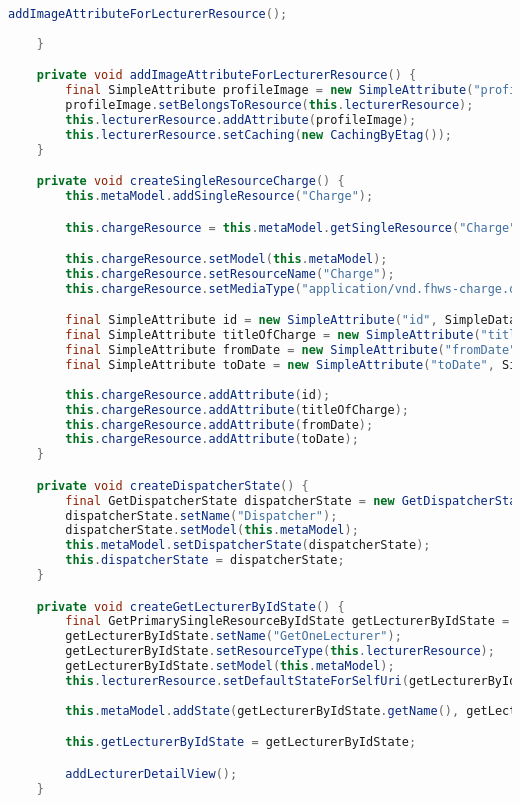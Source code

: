 \begin{lstlisting}[label=lst:enfield_model,
language=java,
firstnumber=1,
caption=Beschreibung des \textit{Enfield-Modell} der Referenzimplementierung. ]
		addImageAttributeForLecturerResource();
		
	}

	private void addImageAttributeForLecturerResource() {
		final SimpleAttribute profileImage = new SimpleAttribute("profileImageUrl", SimpleDatatype.IMAGE);
		profileImage.setBelongsToResource(this.lecturerResource);
		this.lecturerResource.addAttribute(profileImage);
		this.lecturerResource.setCaching(new CachingByEtag());
	}

	private void createSingleResourceCharge() {
		this.metaModel.addSingleResource("Charge");

		this.chargeResource = this.metaModel.getSingleResource("Charge");

		this.chargeResource.setModel(this.metaModel);
		this.chargeResource.setResourceName("Charge");
		this.chargeResource.setMediaType("application/vnd.fhws-charge.default+json");

		final SimpleAttribute id = new SimpleAttribute("id", SimpleDatatype.INT);
		final SimpleAttribute titleOfCharge = new SimpleAttribute("title", SimpleDatatype.STRING);
		final SimpleAttribute fromDate = new SimpleAttribute("fromDate", SimpleDatatype.DATE);
		final SimpleAttribute toDate = new SimpleAttribute("toDate", SimpleDatatype.DATE);
	
		this.chargeResource.addAttribute(id);
		this.chargeResource.addAttribute(titleOfCharge);
		this.chargeResource.addAttribute(fromDate);
		this.chargeResource.addAttribute(toDate);
	}

	private void createDispatcherState() {
		final GetDispatcherState dispatcherState = new GetDispatcherState();
		dispatcherState.setName("Dispatcher");
		dispatcherState.setModel(this.metaModel);
		this.metaModel.setDispatcherState(dispatcherState);
		this.dispatcherState = dispatcherState;
	}

	private void createGetLecturerByIdState() {
		final GetPrimarySingleResourceByIdState getLecturerByIdState = new GetPrimarySingleResourceByIdState();
		getLecturerByIdState.setName("GetOneLecturer");
		getLecturerByIdState.setResourceType(this.lecturerResource);
		getLecturerByIdState.setModel(this.metaModel);
		this.lecturerResource.setDefaultStateForSelfUri(getLecturerByIdState);
		
		this.metaModel.addState(getLecturerByIdState.getName(), getLecturerByIdState);

		this.getLecturerByIdState = getLecturerByIdState;

		addLecturerDetailView();
	}


\end{lstlisting}
